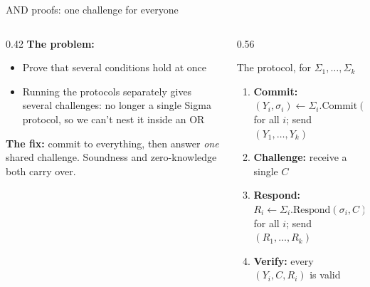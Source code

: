 \ifdefined\PRESENTATION\else\PassOptionsToClass{handout}{beamer}\fi\documentclass[aspectratio=169, lualatex]{beamer}
\begin{document}
\begin{frame}{AND proofs: one challenge for everyone}
	\begin{columns}[c]
		\begin{column}{0.42\textwidth}
			\textbf{The problem:}
			\begin{itemize}
				\item Prove that several conditions hold at once
				\item Running the protocols separately gives several challenges: no longer a single Sigma protocol, so we can't nest it inside an OR
			\end{itemize}
			\textbf{The fix:} commit to everything, then answer \textit{one} shared challenge. Soundness and zero-knowledge both carry over.
		\end{column}
		\begin{column}{0.56\textwidth}
			\begin{block}{The protocol, for $\Sigma_1, \ldots, \Sigma_k$}
				\begin{enumerate}
					\item \textbf{Commit:} $(Y_i, \sigma_i) \leftarrow \Sigma_i.\text{Commit}(X_i, W_i)$ for all $i$; send $(Y_1, \ldots, Y_k)$
					\item \textbf{Challenge:} receive a single $C$
					\item \textbf{Respond:} $R_i \leftarrow \Sigma_i.\text{Respond}(\sigma_i, C)$ for all $i$; send $(R_1, \ldots, R_k)$
					\item \textbf{Verify:} every $(Y_i, C, R_i)$ is valid
				\end{enumerate}
			\end{block}
		\end{column}
	\end{columns}
\end{frame}
\end{document}
